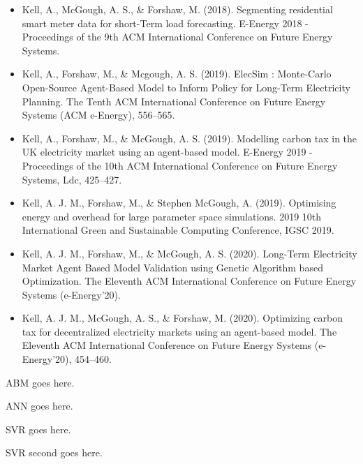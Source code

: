 \begin{itemize}
	\item \cite{Kell2018a} Kell, A., McGough, A. S., \& Forshaw, M. (2018). Segmenting residential smart meter data for short-Term load forecasting. E-Energy 2018 - Proceedings of the 9th ACM International Conference on Future Energy Systems.
	

	
	
	\item \cite{Kell} Kell, A., Forshaw, M., \& Mcgough, A. S. (2019). ElecSim : Monte-Carlo Open-Source Agent-Based Model to Inform Policy for Long-Term Electricity Planning. The Tenth ACM International Conference on Future Energy Systems (ACM e-Energy), 556–565.
	\item \cite{Kell2019a} Kell, A., Forshaw, M., \& McGough, A. S. (2019). Modelling carbon tax in the UK electricity market using an agent-based model. E-Energy 2019 - Proceedings of the 10th ACM International Conference on Future Energy Systems, Ldc, 425–427. 
	\item \cite{Kell2019} Kell, A. J. M., Forshaw, M., \& Stephen McGough, A. (2019). Optimising energy and overhead for large parameter space simulations. 2019 10th International Green and Sustainable Computing Conference, IGSC 2019. 
	\item \cite{Kell2020b} Kell, A. J. M., Forshaw, M., \& McGough, A. S. (2020). Long-Term Electricity Market Agent Based Model Validation using Genetic Algorithm based Optimization. The Eleventh ACM International Conference on Future Energy Systems (e-Energy’20).
	\item \cite{Kell2020a} Kell, A. J. M., McGough, A. S., \& Forshaw, M. (2020). Optimizing carbon tax for decentralized electricity markets using an agent-based model. The Eleventh ACM International Conference on Future Energy Systems (e-Energy’20), 454–460.
\end{itemize}

\Gls{ABM} goes here.

\Gls{ANN} goes here.

\Gls{SVR} goes here.

\Gls{SVR} second goes here.

